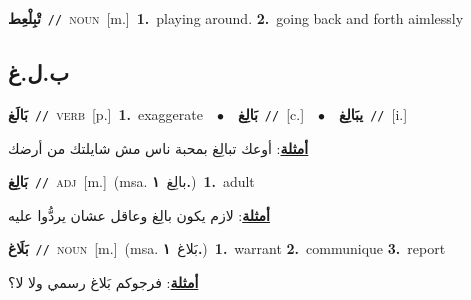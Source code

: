 \documentclass[10pt,a4paper,twoside]{article} %
\begin{document}
\begin{multicols}{2}
{\setlength\topsep{0pt}\textbf{\foreignlanguage{arabic}{تْبِلْعِط}}\ {\color{gray}\texttt{//}\color{black}}\ \textsc{noun}\ [m.]\ \textbf{1.}~playing around.  \textbf{2.}~going back and forth aimlessly\ } \vspace{2mm}

\vspace{-3mm}
\subsection*{\color{blue}\foreignlanguage{arabic}{ب.ل.غ}\color{blue}{}} 

{\setlength\topsep{0pt}\textbf{\foreignlanguage{arabic}{بَالَغ}}\ {\color{gray}\texttt{//}\color{black}}\ \textsc{verb}\ [p.]\ \textbf{1.}~exaggerate\ \ $\bullet$\ \ \setlength\topsep{0pt}\textbf{\foreignlanguage{arabic}{بَالِغ}}\ {\color{gray}\texttt{//}\color{black}}\ [c.]\ \ $\bullet$\ \ \setlength\topsep{0pt}\textbf{\foreignlanguage{arabic}{يبَالِغ}}\ {\color{gray}\texttt{//}\color{black}}\ [i.]\  \begin{flushright}\color{gray}\foreignlanguage{arabic}{\textbf{\underline{\foreignlanguage{arabic}{أمثلة}}}: أوعك تبالِغ بمحبة ناس مش شايلتك من أرضك}\end{flushright}\color{black}} \vspace{2mm}

{\setlength\topsep{0pt}\textbf{\foreignlanguage{arabic}{بَالِغ}}\ {\color{gray}\texttt{//}\color{black}}\ \textsc{adj}\ [m.]\ \color{gray}(msa. \foreignlanguage{arabic}{بالِغ}~\foreignlanguage{arabic}{\textbf{١.}})\color{black}\ \textbf{1.}~adult\  \begin{flushright}\color{gray}\foreignlanguage{arabic}{\textbf{\underline{\foreignlanguage{arabic}{أمثلة}}}: لازم يكون بالِغ وعاقل عشان يردُّوا عليه}\end{flushright}\color{black}} \vspace{2mm}

{\setlength\topsep{0pt}\textbf{\foreignlanguage{arabic}{بَلَاغ}}\ {\color{gray}\texttt{//}\color{black}}\ \textsc{noun}\ [m.]\ \color{gray}(msa. \foreignlanguage{arabic}{بَلاغ}~\foreignlanguage{arabic}{\textbf{١.}})\color{black}\ \textbf{1.}~warrant  \textbf{2.}~communique  \textbf{3.}~report\  \begin{flushright}\color{gray}\foreignlanguage{arabic}{\textbf{\underline{\foreignlanguage{arabic}{أمثلة}}}: فرجوكم بَلاغ رسمي ولا لا؟}\end{flushright}\color{black}} \vspace{2mm}


\end{multicols}
\end{document}
